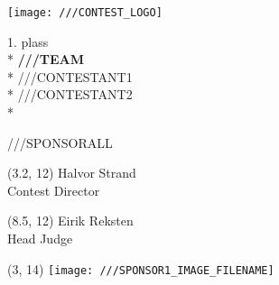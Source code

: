 \documentclass[a4paper]{article}
\begin{document}
\thispagestyle{empty}



\begin{center}
\vspace*{-4cm}
\texttt{[image: ///CONTEST\_LOGO]}
\end{center}

\begin{center}
\vspace{1cm}
{\Huge 1. plass} \\*
\vspace*{1.5cm}
{\Huge \bf ///TEAM} \\*
\vspace*{0.5cm}
{\LARGE ///CONTESTANT1}\\*
\vspace*{0.2cm}
{\LARGE ///CONTESTANT2}\\*


\end{center}

///SPONSORALL

\begin{textblock}{3}(3.2, 12)
\hspace{0.5cm} \makebox[1.5in]{\hrulefill}
\hspace*{1.2cm} Halvor Strand \\
\hspace*{1cm} Contest Director
\end{textblock}

\begin{textblock}{3}(8.5, 12)
\hspace{0.5cm} \makebox[1.5in]{\hrulefill}
\hspace*{1.3cm} Eirik Reksten\\
\hspace*{1.4cm} Head Judge
\end{textblock}



\begin{textblock}{1}(3, 14)
\texttt{[image: ///SPONSOR1\_IMAGE\_FILENAME]}
\end{textblock}

\end{document}
